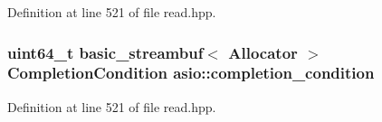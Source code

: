 Definition at line 521 of file read.\+hpp.

\hypertarget{group__async__read_gae2e215d5013596cc2b385bb6c13fa518}{}
\subsubsection[{completion\+\_\+condition}]{\setlength{\rightskip}{0pt plus 5cm}uint64\+\_\+t basic\+\_\+streambuf$<$ Allocator $>$ Completion\+Condition asio\+::completion\+\_\+condition}\label{group__async__read_gae2e215d5013596cc2b385bb6c13fa518}


Definition at line 521 of file read.\+hpp.

